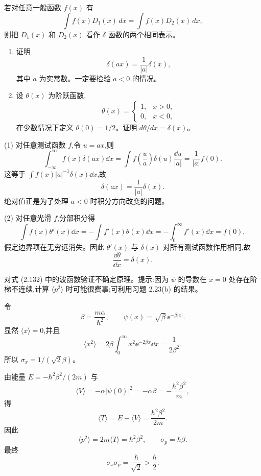 \begin{question}
若对任意一般函数 $f(x)$ 有
\[
\int f(x)D_1(x)\,dx=\int f(x)D_2(x)\,dx,
\]
则把 $D_1(x)$ 和 $D_2(x)$ 看作 $\delta$ 函数的两个相同表示。
\begin{enumerate}
\item 证明
\[
\delta(ax)=\frac{1}{|a|}\delta(x),
\]
其中 $a$ 为实常数。一定要检验 $a<0$ 的情况。
\item 设 $\theta(x)$ 为阶跃函数,
\[
\theta(x)=\begin{cases}1,&x>0,\\0,&x<0,
\end{cases}
\]
在少数情况下定义 $\theta(0)=1/2$。证明 $d\theta/dx=\delta(x)$。
\end{enumerate}
\end{question}
\begin{solution}
(1) 对任意测试函数 $f$,令 $u=ax$,则
\[
\int_{-\infty}^{\infty}f(x)\delta(ax)\dd x
=\int f\left(\frac{u}{a}\right)\delta(u)\frac{\dd u}{|a|}
=\frac1{|a|}f(0).
\]
这等于 $\int f(x)|a|^{-1}\delta(x)\dd x$,故
\[
\delta(ax)=\frac1{|a|}\delta(x).
\]
绝对值正是为了处理 $a<0$ 时积分方向改变的问题。

(2) 对任意光滑 $f$,分部积分得
\[
\int f(x)\theta'(x)\dd x
=-\int f'(x)\theta(x)\dd x
=-\int_0^\infty f'(x)\dd x=f(0),
\]
假定边界项在无穷远消失。因此 $\theta'(x)$ 与 $\delta(x)$ 对所有测试函数作用相同,故
\[
\frac{\dd\theta}{\dd x}=\delta(x).
\]
\end{solution}

\begin{question}
对式 (2.132) 中的波函数验证不确定原理。提示:因为 $\psi$ 的导数在 $x=0$ 处存在阶梯不连续,计算 $\langle p^2\rangle$ 时可能很费事;可利用习题 2.23(b) 的结果。

\par\smallskip
{}

\end{question}
\begin{solution}
令
\[
\beta=\frac{m\alpha}{\hbar^2},
\qquad
\psi(x)=\sqrt\beta\,\ee^{-\beta |x|}.
\]
显然 $\langle x\rangle=0$,并且
\[
\langle x^2\rangle=2\beta\int_0^\infty x^2\ee^{-2\beta x}\dd x=\frac1{2\beta^2}.
\]
所以 $\sigma_x=1/(\sqrt2\beta)$。

由能量 $E=-\hbar^2\beta^2/(2m)$ 与
\[
\langle V\rangle=-\alpha |\psi(0)|^2=-\alpha\beta=-\frac{\hbar^2\beta^2}{m},
\]
得
\[
\langle T\rangle=E-\langle V\rangle=\frac{\hbar^2\beta^2}{2m}.
\]
因此
\[
\langle p^2\rangle=2m\langle T\rangle=\hbar^2\beta^2,
\qquad
\sigma_p=\hbar\beta.
\]
最终
\[
\sigma_x\sigma_p=\frac{\hbar}{\sqrt2}>\frac\hbar2.
\]
\end{solution}


